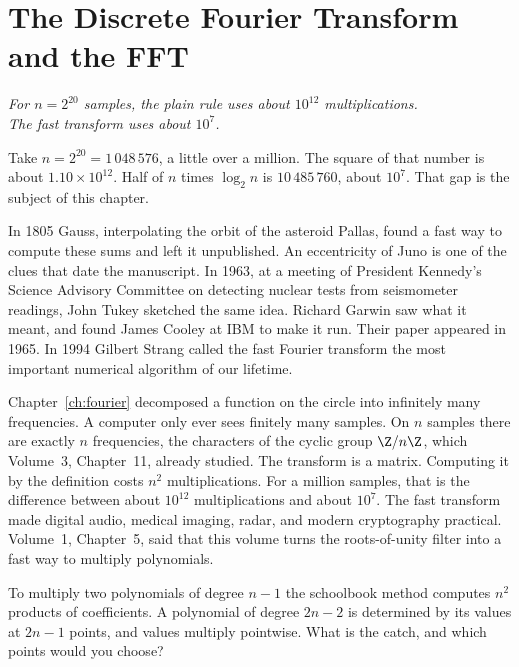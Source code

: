 \chapter{The Discrete Fourier Transform and the FFT}\label{ch:fft}

\begin{center}\itshape
For $n=2^{20}$ samples, the plain rule uses about $10^{12}$ multiplications.\\
The fast transform uses about $10^{7}$.
\end{center}

Take $n=2^{20}=1\,048\,576$, a little over a million. The square of that number is about $1.10\times10^{12}$. Half of $n$ times $\log_2 n$ is $10\,485\,760$, about $10^{7}$. That gap is the subject of this chapter.

In 1805 Gauss, interpolating the orbit of the asteroid Pallas, found a fast way to compute these sums and left it unpublished. An eccentricity of Juno is one of the clues that date the manuscript. In 1963, at a meeting of President Kennedy's Science Advisory Committee on detecting nuclear tests from seismometer readings, John Tukey sketched the same idea. Richard Garwin saw what it meant, and found James Cooley at IBM to make it run. Their paper appeared in 1965. In 1994 Gilbert Strang called the fast Fourier transform the most important numerical algorithm of our lifetime.

Chapter~\ref{ch:fourier} decomposed a function on the circle into infinitely many frequencies. A computer only ever sees finitely many samples. On $n$ samples there are exactly $n$ frequencies, the characters of the cyclic group $\Z/n\Z$, which Volume~3, Chapter~11, already studied. The transform is a matrix. Computing it by the definition costs $n^2$ multiplications. For a million samples, that is the difference between about $10^{12}$ multiplications and about $10^{7}$. The fast transform made digital audio, medical imaging, radar, and modern cryptography practical. Volume~1, Chapter~5, said that this volume turns the roots-of-unity filter into a fast way to multiply polynomials.

\begin{think}
To multiply two polynomials of degree $n-1$ the schoolbook method computes $n^2$ products of coefficients. A polynomial of degree $2n-2$ is determined by its values at $2n-1$ points, and values multiply pointwise. What is the catch, and which points would you choose?
\end{think}

